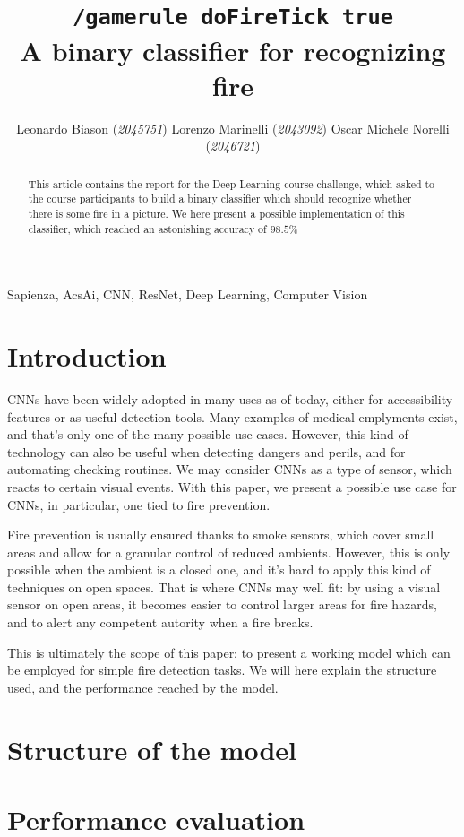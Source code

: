 \documentclass[11pt, journal]{IEEEtran}
\title{\texttt{/gamerule doFireTick true}\\A binary classifier for recognizing fire}
\author{Leonardo Biason (\textit{2045751}) \quad Lorenzo Marinelli (\textit{2043092}) \quad Oscar Michele Norelli (\textit{2046721})}
\newcommand{\nl}{

\medskip

}
\newcommand{\nl}{

\medskip

}
\begin{document}
\maketitle

\begin{abstract}
    This article contains the report for the Deep Learning course challenge, which asked to the course participants to build a binary classifier which should recognize whether there is some fire in a picture. We here present a possible implementation of this classifier, which reached an astonishing accuracy of $98.5\%$
\end{abstract}

\begin{keywords}
    Sapienza, AcsAi, CNN, ResNet, Deep Learning, Computer Vision 
\end{keywords}

\section{Introduction}

CNNs have been widely adopted in many uses as of today, either for accessibility features or as useful detection tools. Many examples of medical emplyments exist, and that's only one of the many possible use cases. However, this kind of technology can also be useful when detecting dangers and perils, and for automating checking routines. We may consider CNNs as a type of sensor, which reacts to certain visual events. With this paper, we present a possible use case for CNNs, in particular, one tied to fire prevention.
\nl
\indent Fire prevention is usually ensured thanks to smoke sensors, which cover small areas and allow for a granular control of reduced ambients. However, this is only possible when the ambient is a closed one, and it's hard to apply this kind of techniques on open spaces. That is where CNNs may well fit: by using a visual sensor on open areas, it becomes easier to control larger areas for fire hazards, and to alert any competent autority when a fire breaks.
\nl
\indent This is ultimately the scope of this paper: to present a working model which can be employed for simple fire detection tasks. We will here explain the structure used, and the performance reached by the model.

\section{Structure of the model}

\lipsum

\section{Performance evaluation}

\lipsum
\end{document}

